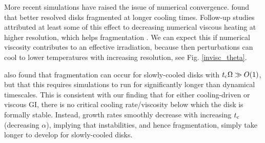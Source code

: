 



More recent simulations have raised the issue of numerical
convergence. %
\cite{meru11} found that better resolved disks fragmented at longer cooling times.
Follow-up studies attributed at least some of this effect to decreasing numerical viscous
heating at higher resolution, which helps fragmentation
\citep{lodato11,meru12}. 
We can expect this if numerical viscosity
contributes to an effective irradiation, %
because then perturbations can cool to lower temperatures with
increasing resolution, see Fig. \ref{invisc_theta}.   

 \cite{paardekooper12} also found that fragmentation can occur 
for  slowly-cooled disks with $t_\mathrm{c}\Omega\gg O(1)$, but that this requires   
simulations to run for significantly longer than dynamical 
timescales. This is consistent with our finding
that for either cooling-driven or viscous GI, there is no critical 
cooling rate/viscosity below  which the disk is  
formally stable. Instead, growth rates smoothly decrease with
increasing $t_\mathrm{c}$ (decreasing $\alpha$), implying that
instabilities, and hence fragmentation, simply take longer to develop
for slowly-cooled disks.         


